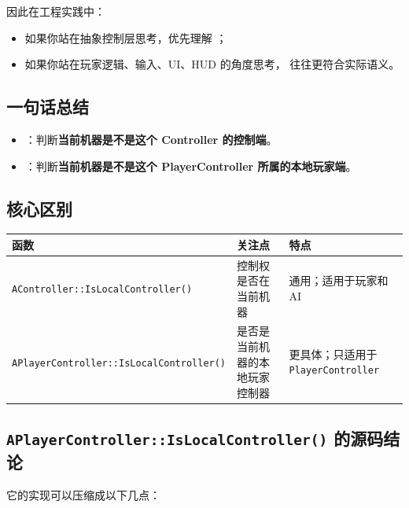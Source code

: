 因此在工程实践中：

\begin{itemize}
	\item 如果你站在抽象控制层思考，优先理解 ；
	\item 如果你站在玩家逻辑、输入、UI、HUD 的角度思考， 往往更符合实际语义。
\end{itemize}




\subsection{一句话总结}

\begin{itemize}
	\item {}：判断\textbf{当前机器是不是这个 Controller 的控制端}。
	\item {}：判断\textbf{当前机器是不是这个 PlayerController 所属的本地玩家端}。
\end{itemize}

\subsection{核心区别}

\begin{center}\footnotesize
	\renewcommand{\arraystretch}{1.5}
	\begin{tabular}{|p{6cm}|p{4.8cm}|p{4.8cm}|}
		\hline
		\textbf{函数} & \textbf{关注点} & \textbf{特点} \\
		\hline
		\texttt{AController::IsLocalController()} & 控制权是否在当前机器 & 通用；适用于玩家和 AI \\
		\hline
		\texttt{APlayerController::IsLocalController()} & 是否是当前机器的本地玩家控制器 & 更具体；只适用于 \texttt{PlayerController} \\
		\hline
	\end{tabular}
\end{center}

\subsection{\texttt{APlayerController::IsLocalController()} 的源码结论}

它的实现可以压缩成以下几点：

